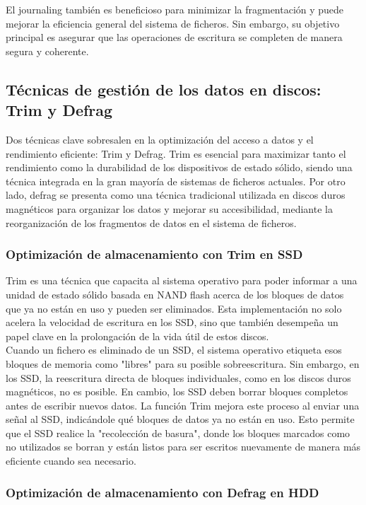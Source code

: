 El journaling también es beneficioso para minimizar la fragmentación y puede mejorar la eficiencia general del sistema de ficheros. Sin embargo, su objetivo principal es asegurar que las operaciones de escritura se completen de manera segura y coherente.

\subsection{Técnicas de gestión de los datos en discos: Trim y Defrag}

Dos técnicas clave sobresalen en la optimización del acceso a datos y el rendimiento eficiente: Trim y Defrag. Trim es esencial para maximizar tanto el rendimiento como la durabilidad de los dispositivos de estado sólido, siendo una técnica integrada en la gran mayoría de sistemas de ficheros actuales. Por otro lado, defrag se presenta como una técnica tradicional utilizada en discos duros magnéticos para organizar los datos y mejorar su accesibilidad, mediante la reorganización de los fragmentos de datos en el sistema de ficheros.

\subsubsection{Optimización de almacenamiento con Trim en SSD}

Trim es una técnica que capacita al sistema operativo para poder informar a una unidad de estado sólido basada en NAND flash acerca de los bloques de datos que ya no están en uso y pueden ser eliminados. Esta implementación no solo acelera la velocidad de escritura en los SSD, sino que también desempeña un papel clave en la prolongación de la vida útil de estos discos.\\

Cuando un fichero es eliminado de un SSD, el sistema operativo etiqueta esos bloques de memoria como "libres" para su posible sobreescritura. Sin embargo, en los SSD, la reescritura directa de bloques individuales, como en los discos duros magnéticos, no es posible. En cambio, los SSD deben borrar bloques completos antes de escribir nuevos datos. La función Trim mejora este proceso al enviar una señal al SSD, indicándole qué bloques de datos ya no están en uso. Esto permite que el SSD realice la "recolección de basura", donde los bloques marcados como no utilizados se borran y están listos para ser escritos nuevamente de manera más eficiente cuando sea necesario.

\subsubsection{Optimización de almacenamiento con Defrag en HDD}

